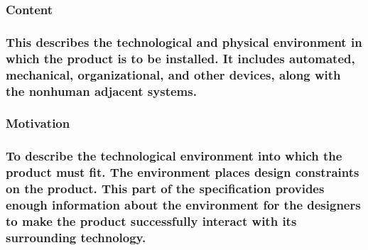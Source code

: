 \documentclass[
]{article}
\begin{document}
\hypertarget{content-11}{%
\subsubsection{Content}\label{content-11}}

\hypertarget{this-describes-the-technological-and-physical-environment-in-which-the-product-is-to-be-installed.-it-includes-automated-mechanical-organizational-and-other-devices-along-with-the-nonhuman-adjacent-systems.}{%
\subsubsection{\texorpdfstring{This describes the technological and
physical environment in which the product is to be installed. It
includes automated, mechanical, organizational, and other devices, along
with the nonhuman adjacent systems.
}{This describes the technological and physical environment in which the product is to be installed. It includes automated, mechanical, organizational, and other devices, along with the nonhuman adjacent systems. }}\label{this-describes-the-technological-and-physical-environment-in-which-the-product-is-to-be-installed.-it-includes-automated-mechanical-organizational-and-other-devices-along-with-the-nonhuman-adjacent-systems.}}

\hypertarget{motivation-11}{%
\subsubsection{Motivation}\label{motivation-11}}

\hypertarget{to-describe-the-technological-environment-into-which-the-product-must-fit.-the-environment-places-design-constraints-on-the-product.-this-part-of-the-specification-provides-enough-information-about-the-environment-for-the-designers-to-make-the-product-successfully-interact-with-its-surrounding-technology.}{%
\subsubsection{To describe the technological environment into which the
product must fit. The environment places design constraints on the
product. This part of the specification provides enough information
about the environment for the designers to make the product successfully
interact with its surrounding
technology.}\label{to-describe-the-technological-environment-into-which-the-product-must-fit.-the-environment-places-design-constraints-on-the-product.-this-part-of-the-specification-provides-enough-information-about-the-environment-for-the-designers-to-make-the-product-successfully-interact-with-its-surrounding-technology.}}
\end{document}
